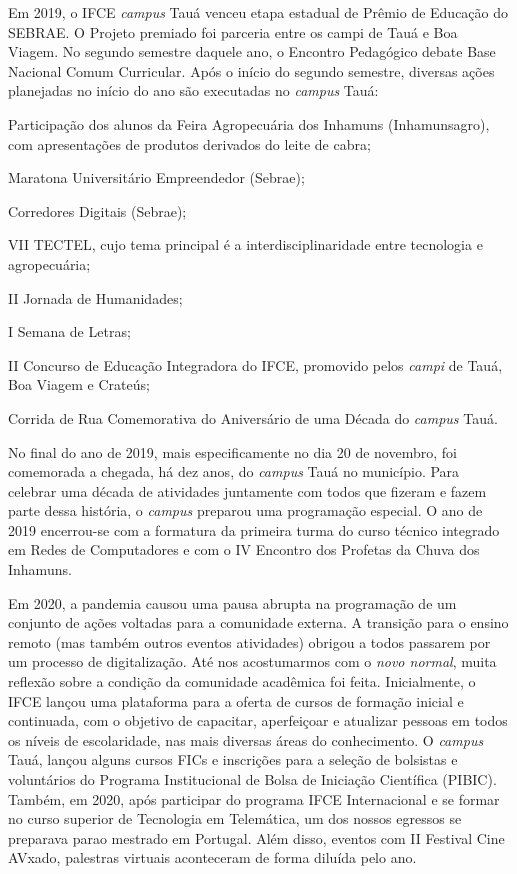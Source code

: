 Em 2019, o IFCE \textit{campus} Tauá venceu etapa estadual de Prêmio de Educação do SEBRAE. O Projeto premiado foi parceria entre os campi de Tauá e Boa Viagem. No segundo semestre daquele ano, o Encontro Pedagógico debate Base Nacional Comum Curricular. Após o início do segundo semestre, diversas ações planejadas no início do ano são executadas no \textit{campus} Tauá:
\begin{alineas}
    \item Participação dos alunos da Feira Agropecuária dos Inhamuns (Inhamunsagro), com apresentações de produtos derivados do leite de cabra;
    \item Maratona Universitário Empreendedor (Sebrae);
    \item  Corredores Digitais (Sebrae);
    \item VII TECTEL, cujo tema principal é a interdisciplinaridade entre tecnologia e agropecuária;
    \item II Jornada de Humanidades;
    \item I Semana de Letras;
    \item II Concurso de Educação Integradora do IFCE, promovido pelos \textit{campi} de Tauá, Boa Viagem e Crateús;
    \item Corrida de Rua Comemorativa do Aniversário de uma Década do \textit{campus} Tauá.
\end{alineas}

No final do ano de 2019, mais especificamente no dia 20 de novembro, foi
comemorada a chegada, há dez anos, do  \textit{campus} Tauá no município.  Para
celebrar uma década de atividades juntamente com todos que fizeram e fazem parte
dessa história, o \textit{campus} preparou uma programação especial. O ano de
2019  encerrou-se com a formatura da primeira turma do curso técnico integrado
em Redes de Computadores e com o  IV Encontro dos Profetas da Chuva dos
Inhamuns.


Em 2020, a pandemia causou
uma pausa abrupta  na programação de  um conjunto de ações voltadas para a comunidade externa.
A transição para o ensino remoto (mas também outros eventos atividades) obrigou a todos passarem por um processo
de digitalização. Até nos acostumarmos com o \textit{novo normal}, muita reflexão sobre a condição da comunidade 
acadêmica foi feita. Inicialmente, o IFCE lançou uma plataforma para a oferta de cursos de formação
inicial e continuada, com o objetivo de capacitar, aperfeiçoar e atualizar
pessoas em todos os níveis de escolaridade, nas mais diversas áreas do
conhecimento. O \textit{campus} Tauá, lançou alguns cursos FICs e  inscrições para a seleção
de bolsistas e voluntários do Programa Institucional de Bolsa de Iniciação
Científica (PIBIC). Também, em 2020, após participar do programa IFCE
Internacional e se formar no curso superior de Tecnologia em Telemática, um dos nossos egressos se preparava parao mestrado em Portugal.
Além disso, eventos com II Festival Cine AVxado, palestras virtuais aconteceram de forma diluída pelo ano.


